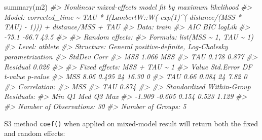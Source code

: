 \documentclass[fleqn,10pt,lineno]{wlpeerj} %
\newenvironment{Shaded}{\begin{snugshade}}{\end{snugshade}}
\newcommand{\CommentTok}[1]{\textcolor[rgb]{0.56,0.35,0.01}{\textit{#1}}}
\newcommand{\FunctionTok}[1]{\textcolor[rgb]{0.00,0.00,0.00}{#1}}
\newcommand{\NormalTok}[1]{#1}
\begin{document}
\begin{Shaded}
\begin{Highlighting}[]
\FunctionTok{summary}\NormalTok{(m2)}
\CommentTok{\#\textgreater{} Nonlinear mixed{-}effects model fit by maximum likelihood}
\CommentTok{\#\textgreater{}   Model: corrected\_time \textasciitilde{} TAU * I(LambertW::W({-}exp(1)\^{}({-}distance/(MSS *      TAU) {-} 1))) + distance/MSS + TAU }
\CommentTok{\#\textgreater{}   Data: train }
\CommentTok{\#\textgreater{}     AIC   BIC logLik}
\CommentTok{\#\textgreater{}   {-}75.1 {-}66.7   43.5}
\CommentTok{\#\textgreater{} }
\CommentTok{\#\textgreater{} Random effects:}
\CommentTok{\#\textgreater{}  Formula: list(MSS \textasciitilde{} 1, TAU \textasciitilde{} 1)}
\CommentTok{\#\textgreater{}  Level: athlete}
\CommentTok{\#\textgreater{}  Structure: General positive{-}definite, Log{-}Cholesky parametrization}
\CommentTok{\#\textgreater{}          StdDev Corr }
\CommentTok{\#\textgreater{} MSS      1.066  MSS  }
\CommentTok{\#\textgreater{} TAU      0.178  0.877}
\CommentTok{\#\textgreater{} Residual 0.026       }
\CommentTok{\#\textgreater{} }
\CommentTok{\#\textgreater{} Fixed effects:  MSS + TAU \textasciitilde{} 1 }
\CommentTok{\#\textgreater{}     Value Std.Error DF t{-}value p{-}value}
\CommentTok{\#\textgreater{} MSS  8.06     0.495 24   16.30       0}
\CommentTok{\#\textgreater{} TAU  0.66     0.084 24    7.82       0}
\CommentTok{\#\textgreater{}  Correlation: }
\CommentTok{\#\textgreater{}     MSS  }
\CommentTok{\#\textgreater{} TAU 0.874}
\CommentTok{\#\textgreater{} }
\CommentTok{\#\textgreater{} Standardized Within{-}Group Residuals:}
\CommentTok{\#\textgreater{}    Min     Q1    Med     Q3    Max }
\CommentTok{\#\textgreater{} {-}1.909 {-}0.605  0.154  0.523  1.129 }
\CommentTok{\#\textgreater{} }
\CommentTok{\#\textgreater{} Number of Observations: 30}
\CommentTok{\#\textgreater{} Number of Groups: 5}
\end{Highlighting}
\end{Shaded}

S3 method \texttt{coef()} when applied on mixed-model result will return both the fixed and random effects:
\end{document}
